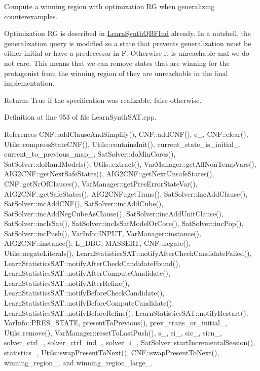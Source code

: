 Compute a winning region with optimization R\-G when generalizing counterexamples. 

Optimization R\-G is described in \hyperlink{classLearnSynthQBFInd}{Learn\-Synth\-Q\-B\-F\-Ind} already. In a nutshell, the generalization query is modified so a state that prevents generalization must be either initial or have a predecessor in F. Otherwise it is unreachable and we do not care. This means that we can remove states that are winning for the protagonist from the winning region of they are unreachable in the final implementation.

\begin{DoxyReturn}{Returns}
True if the specification was realizable, false otherwise. 
\end{DoxyReturn}


Definition at line 953 of file Learn\-Synth\-S\-A\-T.\-cpp.



References C\-N\-F\-::add\-Clause\-And\-Simplify(), C\-N\-F\-::add\-C\-N\-F(), c\-\_\-, C\-N\-F\-::clear(), Utils\-::compress\-State\-C\-N\-F(), Utils\-::contains\-Init(), current\-\_\-state\-\_\-is\-\_\-initial\-\_\-, current\-\_\-to\-\_\-previous\-\_\-map\-\_\-, Sat\-Solver\-::do\-Min\-Cores(), Sat\-Solver\-::do\-Rand\-Models(), Utils\-::extract(), Var\-Manager\-::get\-All\-Non\-Temp\-Vars(), A\-I\-G2\-C\-N\-F\-::get\-Next\-Safe\-States(), A\-I\-G2\-C\-N\-F\-::get\-Next\-Unsafe\-States(), C\-N\-F\-::get\-Nr\-Of\-Clauses(), Var\-Manager\-::get\-Pres\-Error\-State\-Var(), A\-I\-G2\-C\-N\-F\-::get\-Safe\-States(), A\-I\-G2\-C\-N\-F\-::get\-Trans(), Sat\-Solver\-::inc\-Add\-Clause(), Sat\-Solver\-::inc\-Add\-C\-N\-F(), Sat\-Solver\-::inc\-Add\-Cube(), Sat\-Solver\-::inc\-Add\-Neg\-Cube\-As\-Clause(), Sat\-Solver\-::inc\-Add\-Unit\-Clause(), Sat\-Solver\-::inc\-Is\-Sat(), Sat\-Solver\-::inc\-Is\-Sat\-Model\-Or\-Core(), Sat\-Solver\-::inc\-Pop(), Sat\-Solver\-::inc\-Push(), Var\-Info\-::\-I\-N\-P\-U\-T, Var\-Manager\-::instance(), A\-I\-G2\-C\-N\-F\-::instance(), L\-\_\-\-D\-B\-G, M\-A\-S\-S\-E\-R\-T, C\-N\-F\-::negate(), Utils\-::negate\-Literals(), Learn\-Statistics\-S\-A\-T\-::notify\-After\-Check\-Candidate\-Failed(), Learn\-Statistics\-S\-A\-T\-::notify\-After\-Check\-Candidate\-Found(), Learn\-Statistics\-S\-A\-T\-::notify\-After\-Compute\-Candidate(), Learn\-Statistics\-S\-A\-T\-::notify\-After\-Refine(), Learn\-Statistics\-S\-A\-T\-::notify\-Before\-Check\-Candidate(), Learn\-Statistics\-S\-A\-T\-::notify\-Before\-Compute\-Candidate(), Learn\-Statistics\-S\-A\-T\-::notify\-Before\-Refine(), Learn\-Statistics\-S\-A\-T\-::notify\-Restart(), Var\-Info\-::\-P\-R\-E\-S\-\_\-\-S\-T\-A\-T\-E, present\-To\-Previous(), prev\-\_\-trans\-\_\-or\-\_\-initial\-\_\-, Utils\-::remove(), Var\-Manager\-::reset\-To\-Last\-Push(), s\-\_\-, si\-\_\-, sic\-\_\-, sicn\-\_\-, solver\-\_\-ctrl\-\_\-, solver\-\_\-ctrl\-\_\-ind\-\_\-, solver\-\_\-i\-\_\-, Sat\-Solver\-::start\-Incremental\-Session(), statistics\-\_\-, Utils\-::swap\-Present\-To\-Next(), C\-N\-F\-::swap\-Present\-To\-Next(), winning\-\_\-region\-\_\-, and winning\-\_\-region\-\_\-large\-\_\-.




